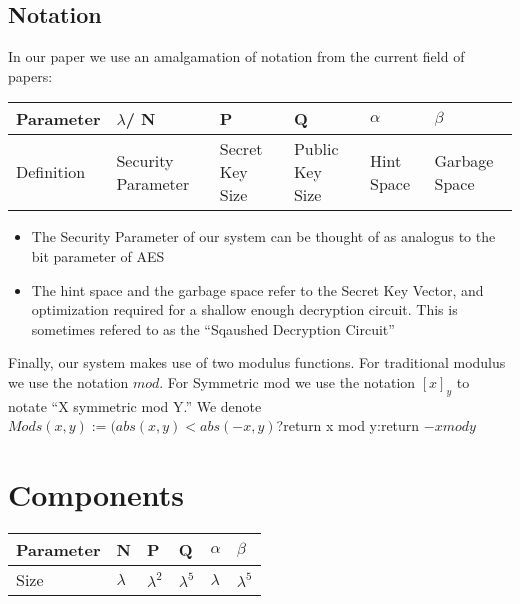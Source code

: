 \documentclass[letterpaper,11pt]{article} %
\begin{document}
\subsection{Notation}
In our paper we use an amalgamation of notation from the current field of papers:


\begin{center}
\begin{tabular}{ l | l | l | l | l | l }
\hline
Parameter & $\lambda$/ N & P & Q & $\alpha$ & $\beta$ \\ \hline
Definition & Security Parameter & Secret Key Size   & Public Key Size & Hint Space & Garbage Space  \\ \hline
\end{tabular}
\end{center}

\begin{itemize}
\item The Security Parameter of our system  can be thought of as analogus to the bit parameter of AES
\item The hint space and the garbage space refer to the Secret Key Vector, and optimization required for a shallow enough decryption circuit. This is sometimes refered to as the ``Sqaushed Decryption Circuit'' 
\end{itemize}

Finally, our system makes use of two modulus functions. For traditional modulus we use the notation $mod$. For Symmetric mod we use the notation $[x]_y$ to notate ``X symmetric mod Y.''
We denote $Mods(x,y):=(abs(x,y)<abs(-x,y)$?return x mod y:return $-x mod y$

\section*{Components}





\begin{center}
\begin{tabular}{  l | l | l | l | l | l }
\hline
Parameter & N & P & Q & $\alpha$ & $\beta$ \\ \hline
Size &  $\lambda$ & $\lambda ^2$  & $\lambda ^5$ & $\lambda$ & $\lambda ^5$  \\ \hline
\end{tabular}
\end{center}
\end{document}
